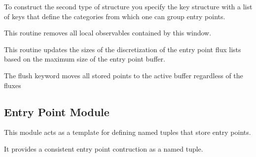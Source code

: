 \documentclass[letterpaper,10pt,english]{sphinxmanual}
\begin{document}
\begin{fulllineitems}
\begin{fulllineitems}
To construct the second type of structure you specify the key structure with a list of keys that define the
categories from which one can group entry points.

\end{fulllineitems}


\begin{fulllineitems}
\label{applications/applications.doc:basisFunctions.basisFunction.remove_local_observales}
This routine removes all local observables contained by this window.

\end{fulllineitems}


\begin{fulllineitems}
\label{applications/applications.doc:basisFunctions.basisFunction.update_entry_points_fluxes}
This routine updates the sizes of the discretization of the entry point flux lists based on the maximum size of the entry point buffer.

The flush keyword moves all stored points to the active buffer regardless of the fluxes

\end{fulllineitems}


\end{fulllineitems}



\subsection{Entry Point Module}
\label{applications/applications.doc:entry-point-module}\label{applications/applications.doc:module-entryPoints}
This module acts as a template for defining named tuples that store entry points.

It provides a consistent entry point contruction as a named tuple.
\end{document}
